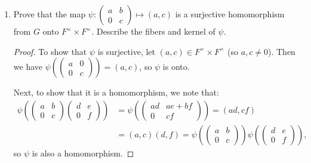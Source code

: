 \documentclass{article}
\begin{document}
\begin{enumerate}[label=(\alph*), itemsep=0em]
\begin{proof}
            The kernel of $\varphi$ is $\{ \begin{pmatrix}1 & b \\ 0 & c\end{pmatrix} \mid b, c \in F, c \neq 0 \}$, and the fiber of $\varphi$ over a given element $a \in F^\times$ is $\{ \begin{pmatrix} a & b \\ 0 & c\end{pmatrix} \mid b, c \in F, c \neq 0 \}$.
          \end{proof}
    \item Prove that the map $\psi: \begin{pmatrix}a & b \\ 0 & c\end{pmatrix} \mapsto (a, c)$ is a surjective homomorphism from $G$ onto $F^\times \times F^\times$. Describe the fibers and kernel of $\psi$.
          \begin{proof}
            To show that $\psi$ is surjective, let $(a, c) \in F^\times \times F^\times$ (so $a, c \neq 0$). Then we have $\psi(\begin{pmatrix}a & 0 \\ 0 & c\end{pmatrix}) = (a, c)$, so $\psi$ is onto.

            Next, to show that it is a homomorphism, we note that:
            \begin{align*}
                \psi(\begin{pmatrix}a & b \\ 0 & c\end{pmatrix}\begin{pmatrix}d & e \\ 0 & f\end{pmatrix}) &= \psi(\begin{pmatrix}ad & ae + bf \\ 0 & cf\end{pmatrix}) = (ad, cf) \\ &= (a, c)(d, f) = \psi(\begin{pmatrix}a & b \\ 0 & c\end{pmatrix})\psi(\begin{pmatrix}d & e \\ 0 & f\end{pmatrix}),
            \end{align*}
            so $\psi$ is also a homomorphism.


\end{proof}
\end{enumerate}
\end{document}
